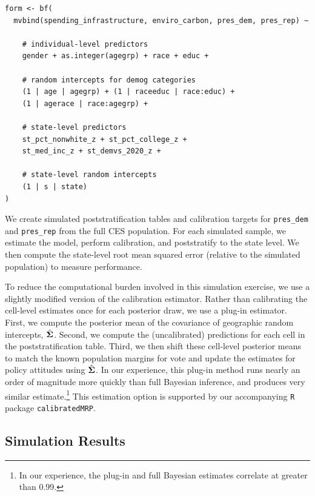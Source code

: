 \begin{scriptsize}
\lstset{language=R}
\begin{lstlisting}
form <- bf(
  mvbind(spending_infrastructure, enviro_carbon, pres_dem, pres_rep) ~ 

    # individual-level predictors
    gender + as.integer(agegrp) + race + educ +
    
    # random intercepts for demog categories
    (1 | age | agegrp) + (1 | raceeduc | race:educ) + 
    (1 | agerace | race:agegrp) +
    
    # state-level predictors
    st_pct_nonwhite_z + st_pct_college_z + 
    st_med_inc_z + st_demvs_2020_z +

    # state-level random intercepts
    (1 | s | state) 
)
\end{lstlisting}
\end{scriptsize}

We create simulated poststratification tables and calibration targets for \texttt{pres\_dem} and \texttt{pres\_rep} from the full CES population.
For each simulated sample, we estimate the model, perform calibration, and poststratify to the state level. 
We then compute the state-level root mean squared error (relative to the simulated population) to measure performance.

To reduce the computational burden involved in this simulation exercise, we use a slightly modified version of the calibration estimator. 
Rather than calibrating the cell-level estimates once for each posterior draw, we use a plug-in estimator.
First, we compute the posterior mean of the covariance of geographic random intercepts, $\hat{\mathbf{\Sigma}}$. 
Second, we compute the (uncalibrated) predictions for each cell in the poststratification table.
Third, we then shift these cell-level posterior means to match the known population margins for vote and update the estimates for policy attitudes using $\hat{\mathbf{\Sigma}}$.
In our experience, this plug-in method runs nearly an order of magnitude more quickly than full Bayesian inference, and produces very similar estimate.\footnote{In our experience, the plug-in and full Bayesian estimates correlate at greater than 0.99.%
}
This estimation option is supported by our accompanying \texttt{R} package \texttt{calibratedMRP}.

 


\subsection{Simulation Results}

